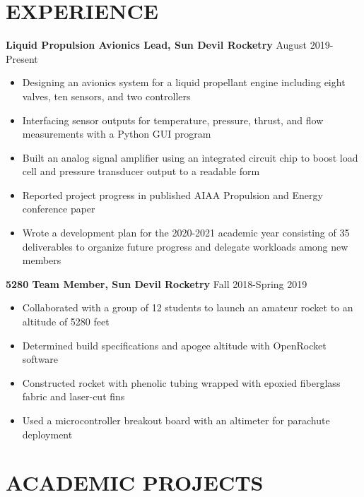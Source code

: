 \documentclass{article}
\begin{document}
\section{EXPERIENCE}
\textbf{Liquid Propulsion Avionics Lead, Sun Devil Rocketry}
\hfill
\vspace{0.5em}
August 2019-Present
\begin{itemize}
	\item{Designing an avionics system for a liquid propellant engine including eight valves, ten sensors, and two controllers}
	\item{Interfacing sensor outputs for temperature, pressure, thrust, and flow measurements with a Python GUI program}
	\item{Built an analog signal amplifier using an integrated circuit chip to boost load cell and pressure transducer output to a readable form}
	\item{Reported project progress in published AIAA Propulsion and Energy conference paper}
	\item{Wrote a development plan for the 2020-2021 academic year consisting of 35 deliverables to organize future progress and delegate workloads among new members}
\end{itemize}
\vspace{1em}
\textbf{5280 Team Member, Sun Devil Rocketry}
\hfill Fall 2018-Spring 2019
\vspace{0.5em}
\begin{itemize}
	\item Collaborated with a group of 12 students to launch an amateur rocket to an altitude of 5280 feet
	\item Determined build specifications and apogee altitude with OpenRocket software
	\item Constructed rocket with phenolic tubing wrapped with epoxied fiberglass fabric and laser-cut fins 
	\item Used a microcontroller breakout board with an altimeter for parachute deployment
\end{itemize}
\section{ACADEMIC PROJECTS}
\end{document}
